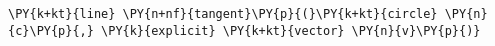 \begin{Verbatim}[commandchars=\\\{\}]
    \PY{k+kt}{line} \PY{n+nf}{tangent}\PY{p}{(}\PY{k+kt}{circle} \PY{n}{c}\PY{p}{,} \PY{k}{explicit} \PY{k+kt}{vector} \PY{n}{v}\PY{p}{)}
\end{Verbatim}
